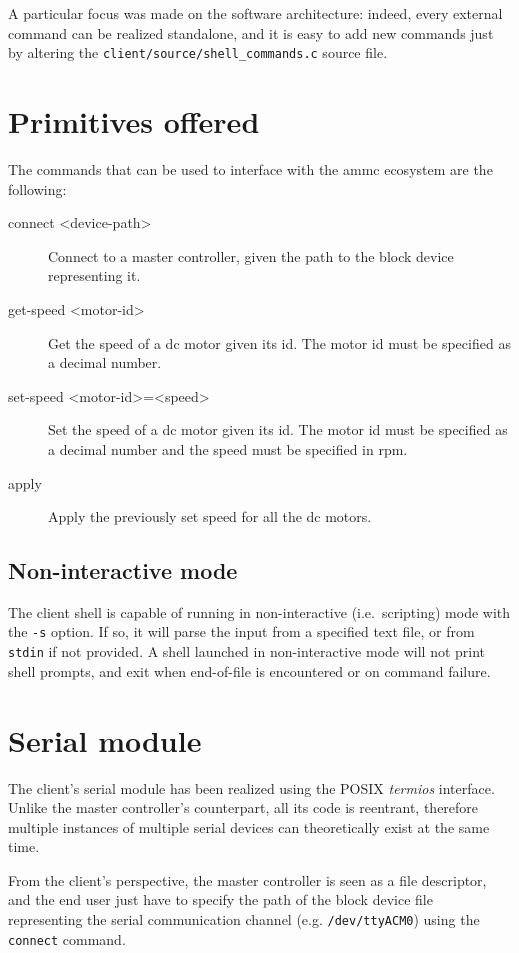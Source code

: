 \documentclass[binding=0.6cm,Lau]{sapthesis}
\begin{document}
A particular focus was made on the software architecture: indeed, every
external command can be realized standalone, and it is easy to add new
commands just by altering the \texttt{client/source/shell\_commands.c} source
file.

\section{Primitives offered}
The commands that can be used to interface with the ammc ecosystem are the
following:
\begin{description}
  \item[connect <device-path>] Connect to a master controller, given the path
    to the block device representing it.
  \item[get-speed <motor-id>] Get the speed of a dc motor given its id.
    The motor id must be specified as a decimal number.
  \item[set-speed <motor-id>=<speed>] Set the speed of a dc motor given its id.
    The motor id must be specified as a decimal number and the speed must be
    specified in rpm.
  \item[apply] Apply the previously set speed for all the dc motors.
\end{description}

\subsection{Non-interactive mode}
The client shell is capable of running in non-interactive (i.e.\ scripting)
mode with the \texttt{-s} option.  If so, it will parse the input from a
specified text file, or from \texttt{stdin} if not provided.  A shell launched
in non-interactive mode will not print shell prompts, and exit when end-of-file
is encountered or on command failure.

\section{Serial module}
The client's serial module has been realized using the POSIX \emph{termios}
interface. Unlike the master controller's counterpart, all its code is
reentrant, therefore multiple instances of multiple serial devices can
theoretically exist at the same time.

From the client's perspective, the master controller is seen as a file
descriptor, and the end user just have to specify the path of the block device
file representing the serial communication channel (e.g. \texttt{/dev/ttyACM0})
using the \texttt{connect} command.
\end{document}
